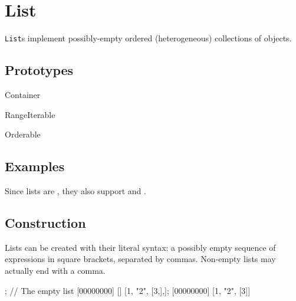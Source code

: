 
\section{List}

\lstinline|List|s implement possibly-empty ordered (heterogeneous)
collections of objects.

\subsection{Prototypes}

\begin{refObjects}
\item[Container]
\item[RangeIterable]
\item[Orderable]
\end{refObjects}

\subsection{Examples}

Since lists are , they also support
 and .



\subsection{Construction}

Lists can be created with their literal syntax: a possibly empty sequence of
expressions in square brackets, separated by commas.  Non-empty lists may
actually end with a comma.

\begin{urbiscript}
[]; // The empty list
[00000000] []
[1, "2", [3,],];
[00000000] [1, "2", [3]]
\end{urbiscript}

